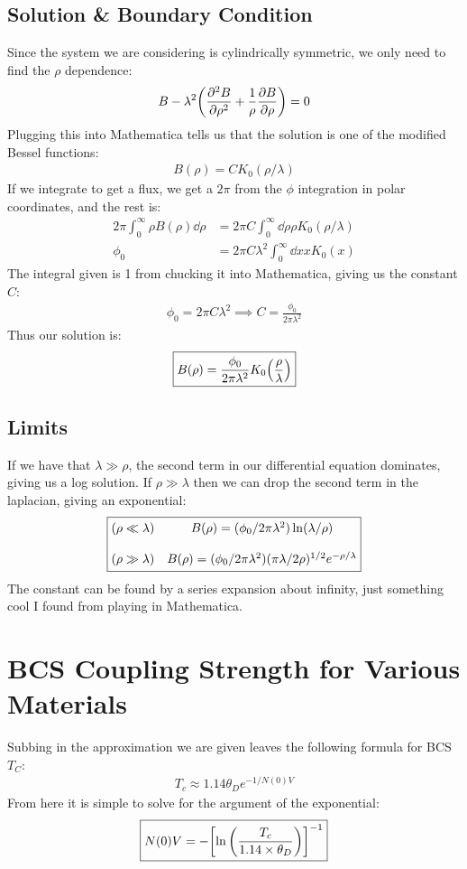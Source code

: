 \documentclass[12pt]{article}
\begin{document}
\subsection{Solution \& Boundary Condition}
Since the system we are considering is cylindrically symmetric, we only need to find the $\rho$ dependence:
\begin{align*}
  B-\lambda^2\qty(\pdv[2]{B}{\rho}+\frac1\rho\pdv{B}{\rho})=0
\end{align*}
Plugging this into Mathematica tells us that the solution is one of the modified Bessel functions:
\begin{align*}
  B(\rho)=CK_0(\rho/\lambda)
\end{align*}
If we integrate to get a flux, we get a $2\pi$ from the $\phi$ integration in polar coordinates, and the rest is:
\begin{align*}
  2\pi\int_0^\infty\rho B(\rho)\dd{\rho}&=2\pi C
  \int_0^\infty\dd{\rho}\rho K_0(\rho/\lambda)\\
  \phi_0&=2\pi C\lambda^2\int_0^\infty\dd{x}xK_0(x)
\end{align*}
The integral given is 1 from chucking it into Mathematica, giving us the constant $C$:
\begin{align*}
  \phi_0=2\pi C\lambda^2\implies \boxed{C=\frac{\phi_0}{2\pi\lambda^2}}
\end{align*}
Thus our solution is:
\begin{align*}
  \boxed{B(\rho)=\frac{\phi_0}{2\pi\lambda^2}K_0\qty(\frac{\rho}{\lambda})}
\end{align*}
\subsection{Limits}
If we have that $\lambda\gg\rho$, the second term in our differential equation dominates, giving us a log solution. If $\rho\gg\lambda$ then we can drop the second term in the laplacian, giving an exponential:
\begin{align*}
  \boxed{
    \mqty{(\rho\ll\lambda)&B(\rho)=(\phi_0/2\pi\lambda^2)\ln(\lambda/\rho)\\\\
    (\rho\gg\lambda)&B(\rho)=(\phi_0/2\pi\lambda^2)(\pi\lambda/2\rho)^{1/2}
    e^{-\rho/\lambda}}}
\end{align*}
The constant can be found by a series expansion about infinity, just something cool I found from playing in Mathematica. 
\newpage\section{BCS Coupling Strength for Various Materials}
Subbing in the approximation we are given leaves the following formula for BCS $T_C$:
\begin{align*}
  T_c\approx1.14\theta_De^{-1/N(0)V}
\end{align*}
From here it is simple to solve for the argument of the exponential:
\begin{align*}
  \boxed{N(0)V=-\qty[\ln\qty(\frac{T_c}{1.14\times\theta_D})]^{-1}}
\end{align*}
\end{document}
